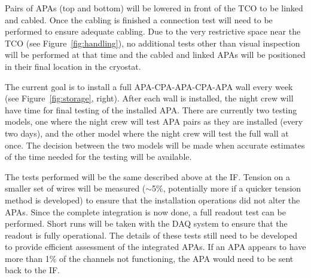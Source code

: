 Pairs of APAs (top and bottom) will be lowered in front of the TCO to be linked and cabled. Once the cabling is finished a connection test will need to be performed to ensure adequate cabling. Due to the very restrictive space near the TCO (see Figure~\ref{fig:handling}), no additional tests other than visual inspection will be performed at that time and the cabled and linked APAs will be positioned in their final location in the cryostat.


The current goal is to install a full APA-CPA-APA-CPA-APA wall every week (see Figure~\ref{fig:storage}, right). After each wall is installed, the night crew will have time for final testing of the installed APA. There are currently two testing models, one where the night crew will test APA pairs as they are installed (every two days), and the other model where the night crew will test the full wall at once. The decision between the two models will be made when accurate estimates of the time needed for the testing will be available.


The tests performed will be the same described above at the IF. Tension on a smaller set of wires will be measured ($\sim$5\%, potentially more if a quicker tension method is developed) to ensure that the installation operations did not alter the APAs. Since the complete integration is now done, a full readout test can be performed. Short runs will be taken with the DAQ system to ensure that the readout is fully operational. The details of these tests still need to be developed to provide efficient assessment of the integrated APAs. If an APA appears to have more than 1$\%$ of the channels not functioning, the APA would need to be sent back to the IF.

